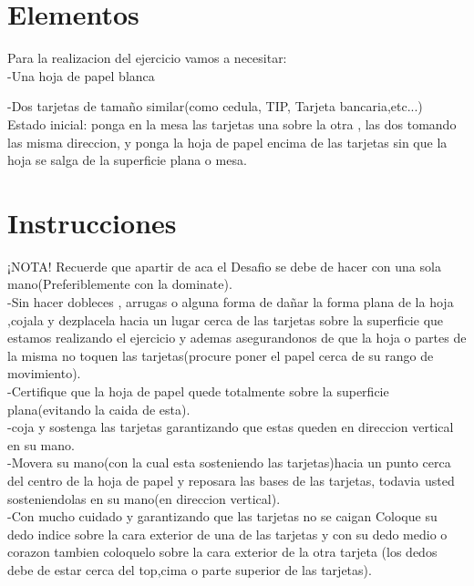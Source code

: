 \documentclass{article}
\begin{document}
\section{Elementos} \label{contenido}
Para la realizacion del ejercicio vamos a necesitar:\\

    -Una hoja de papel blanca
    
    -Dos tarjetas de tamaño similar(como cedula, TIP, Tarjeta bancaria,etc...)\\
    
    Estado inicial: ponga en la mesa las tarjetas una sobre la otra , las  dos tomando las misma direccion, y ponga la hoja de papel encima de las tarjetas sin que la hoja se salga de la superficie plana o mesa.

\section{Instrucciones} \label{contenido}
    ¡NOTA! Recuerde que apartir de aca el Desafio se debe de hacer con una sola mano(Preferiblemente con la dominate).\\
    
    
    -Sin hacer dobleces , arrugas o alguna forma de dañar la forma plana de la hoja ,cojala  y dezplacela hacia un lugar cerca de las tarjetas sobre la superficie que estamos realizando el ejercicio y ademas asegurandonos de que la hoja o partes de la misma no toquen las  tarjetas(procure poner el papel cerca de su rango de movimiento).\\
    
    
    -Certifique que la hoja de papel quede totalmente sobre la superficie plana(evitando la caida de esta).\\

    
    -coja y sostenga las  tarjetas garantizando que estas queden en direccion vertical en su mano.\\

    
    -Movera su mano(con la cual esta sosteniendo las tarjetas)hacia un punto cerca del centro de la hoja de papel  y reposara las bases de las tarjetas, todavia    usted sosteniendolas en su mano(en direccion vertical).\\
 
    
    -Con mucho cuidado y garantizando que las tarjetas no se caigan Coloque su dedo indice sobre la cara exterior de una de las tarjetas y con su dedo medio o corazon tambien coloquelo sobre la cara exterior de la otra tarjeta (los dedos debe de estar cerca del top,cima  o parte superior de las tarjetas).\\
\end{document}
